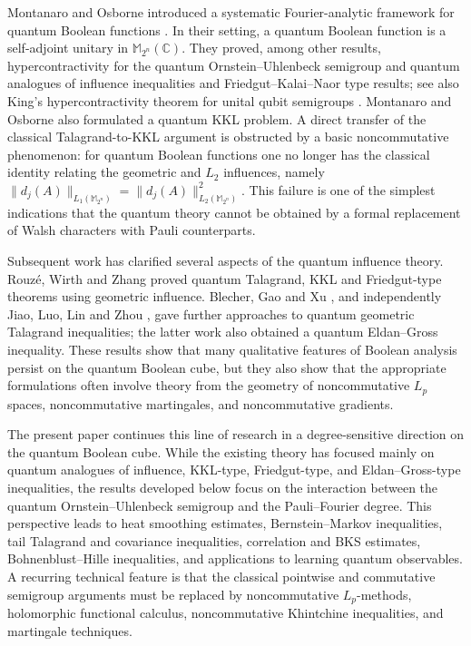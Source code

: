 \documentclass{amsbook}
\theoremstyle{definition}
\theoremstyle{remark}
\numberwithin{section}{chapter}
\numberwithin{equation}{chapter}
\newcommand{\1}{\mathbf{1}}
\begin{document}
Montanaro and Osborne introduced a systematic Fourier-analytic framework for quantum Boolean functions \cite{MO2010}.  In their setting, a quantum Boolean function is a self-adjoint unitary in $\mathbb M_{2^n}(\mathbb C)$.  They proved, among other results, hypercontractivity for the quantum Ornstein--Uhlenbeck semigroup and quantum analogues of influence inequalities and Friedgut--Kalai--Naor type results; see also King's hypercontractivity theorem for unital qubit semigroups \cite{Ki2014}.  Montanaro and Osborne also formulated a quantum KKL problem.  A direct transfer of the classical Talagrand-to-KKL argument is obstructed by a basic noncommutative phenomenon: for quantum Boolean functions one no longer has the classical identity relating the geometric and $L_{2}$ influences, namely $\|d_{j}(A)\|_{L_{1}(\mathbb M_{2^{n}})}=\|d_{j}(A)\|_{L_{2}(\mathbb M_{2^{n}})}^{2}$. This failure is one of the simplest indications that the quantum theory cannot be obtained by a formal replacement of Walsh characters with Pauli counterparts.

Subsequent work has clarified several aspects of the quantum influence theory.  Rouz\'e, Wirth and Zhang  \cite{RWZ2024} proved quantum Talagrand, KKL and Friedgut-type theorems using geometric influence.  Blecher, Gao and Xu \cite{BGX2025}, and independently Jiao, Luo, Lin and Zhou \cite{JLLZ2025}, gave further approaches to quantum geometric Talagrand inequalities; the latter work also obtained a quantum Eldan--Gross inequality.  These results show that many qualitative features of Boolean analysis persist on the quantum Boolean cube, but they also show that the appropriate formulations often involve theory from the geometry of noncommutative $L_{p}$ spaces, noncommutative martingales, and noncommutative gradients.



The present paper continues this line of research in a degree-sensitive direction on the quantum Boolean cube. While the existing theory has focused mainly on quantum analogues of influence, KKL-type, Friedgut-type, and Eldan--Gross-type inequalities, the results developed below focus on the interaction between the quantum Ornstein--Uhlenbeck semigroup and the Pauli--Fourier degree. This perspective leads to heat smoothing estimates, Bernstein--Markov inequalities, tail Talagrand and covariance inequalities, correlation and BKS estimates, Bohnenblust--Hille inequalities, and applications to learning quantum observables. A recurring technical feature is that the classical pointwise and commutative semigroup arguments must be replaced by noncommutative $L_{p}$-methods, holomorphic functional calculus, noncommutative Khintchine inequalities, and martingale techniques.
\end{document}
